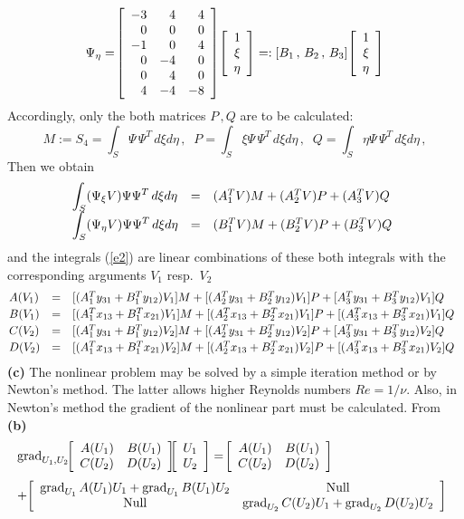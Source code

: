 \documentclass[12pt,a4paper,USenglish,twoside]{book}
\begin{document}
\[
\Psi_{\eta} = \ \ba{[}{rrr}
 -3 & 4 & 4\\
  0 & 0 & 0\\
 -1 & 0 & 4\\
 0 & -4 & 0\\
 0 & 4 & 0\\
 4 & -4 & -8\ea{]}\
\ba{[}{r}1\\ \xi \\ \eta\ea{]}
 =: [B_1\,,\, B_2\,,\, B_3]\ \ba{[}{r}1\\ \xi \\ \eta\ea{]}
\]
Accordingly, only the both matrices $P\,,Q$ are to be calculated:
\[
M := S_4 = \int_S \Psi\,\Psi^T\, d\xi d\eta\,, \;\;
P = \int_S\xi \Psi\,\Psi^T\, d\xi d\eta\,, \;\;
Q = \int_S\eta \Psi\,\Psi^T\, d\xi d\eta\,,
\]
Then we obtain
\[
\ba{.}{lll}
\dis \int_S(\Psi_{\xi}V)\Psi\Psi^T \,d\xi d\eta
&=& (A_1^TV)M + (A_2^TV)P + (A_3^TV)Q\\[1ex]
\dis \int_S(\Psi_{\eta}V)\Psi\Psi^T \,d\xi d\eta
&=& (B_1^TV)M + (B_2^TV)P + (B_3^TV)Q\\[1ex]
\ea{.}
\]
and the integrals (\ref{e2}) are linear combinations of these both integrals with the 
corresponding arguments $V_1$ resp.\ $V_2$
\[
\ba{.}{lll}
A(V_1) &=& [(A^T_1y_{31} + B^T_1y_{12})V_1]M + [(A^T_2y_{31} + B^T_2y_{12})V_1]P
+ [A^T_3y_{31} + B^T_3y_{12})V_1]Q\\[0.5ex]
%
B(V_1) &=& [(A^T_1x_{13} + B^T_1x_{21})V_1]M + [(A^T_2x_{13} + B^T_2x_{21})V_1]P
+ [(A^T_3x_{13} + B^T_3x_{21})V_1]Q\\[0.5ex]
%
C(V_2) &=& [(A^T_1y_{31} + B^T_1y_{12})V_2]M + [(A^T_2y_{31} + B^T_2y_{12})V_2]P
+ [A^T_3y_{31} + B^T_3y_{12})V_2]Q\\[0.5ex]
%
D(V_2) &=& [(A^T_1x_{13} + B^T_1x_{21})V_2]M + [(A^T_2x_{13} + B^T_2x_{21})V_2]P
+ [(A^T_3x_{13} + B^T_3x_{21})V_2]Q
\ea{.}
\]
{\bf(c)}
The nonlinear problem may be solved by a simple iteration method or by {\sc Newton}'s 
method. The latter allows higher {\sc Reynolds} numbers $Re = 1/\nu$. Also, in {\sc 
Newton}'s method the gradient of the nonlinear part must be calculated. From {\bf (b)}
\[
\ba{.}{l}
\grad_{U_1,U_2}
\, \ba{[}{rr} A(U_1) & B(U_1)\\ C(U_2) & D(U_2)\ea{]}
\ba{[}{r}U_1\\ U_2\ea{]}
= \ \ba{[}{rr} A(U_1) & B(U_1)\\ C(U_2) & D(U_2)\ea{]}
\\[3ex]
 + \ \ba{[}{cc} \grad_{U_1}A(U_1)U_1 + \grad_{U_1}B(U_1)U_2 & \text{Null} \\ 
     \text{Null} & \grad_{U_2}C(U_2)U_1 + \grad_{U_2}D(U_2)U_2\ea{]}
\ea{.}     
\]
\end{document}
